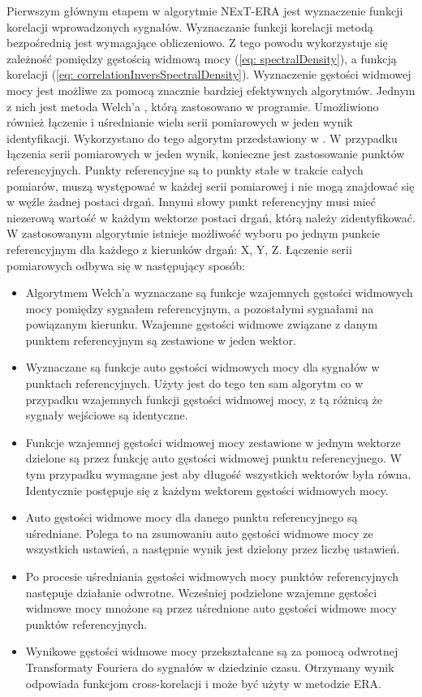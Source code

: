 Pierwszym głównym etapem w algorytmie NExT-ERA jest wyznaczenie funkcji korelacji wprowadzonych sygnałów. Wyznaczanie funkcji korelacji metodą bezpośrednią jest wymagające obliczeniowo. Z tego powodu wykorzystuje się zależność pomiędzy gęstością widmową mocy (\ref{eq: spectralDensity}), a funkcją korelacji (\ref{eq: correlationInversSpectralDensity}). Wyznaczenie gęstości widmowej mocy jest możliwe za pomocą znacznie bardziej efektywnych algorytmów. Jednym z nich jest metoda Welch'a \parencite{Brincker2015,Welch1967}, którą zastosowano w programie. Umożliwiono również łączenie i uśrednianie wielu serii pomiarowych w jeden wynik identyfikacji. Wykorzystano do tego algorytm przedstawiony w \cite{Brownjohn2010}. W przypadku łączenia serii pomiarowych w jeden wynik, konieczne jest zastosowanie punktów referencyjnych. Punkty referencyjne są to punkty stałe w trakcie całych pomiarów, muszą występować w każdej serii pomiarowej i nie mogą znajdować się w węźle żadnej postaci drgań. Innymi słowy punkt referencyjny musi mieć niezerową wartość w każdym wektorze postaci drgań, którą należy zidentyfikować. W zastosowanym algorytmie istnieje możliwość wyboru po jednym punkcie referencyjnym dla każdego z kierunków drgań: X, Y, Z. Łączenie serii pomiarowych odbywa się w następujący sposób:
\begin{itemize}
	\item Algorytmem Welch'a wyznaczane są funkcje wzajemnych gęstości widmowych mocy pomiędzy sygnałem referencyjnym, a pozostałymi sygnałami na powiązanym kierunku.  Wzajemne gęstości widmowe związane z danym punktem referencyjnym są zestawione w jeden wektor.
	\item Wyznaczane są funkcje auto gęstości widmowych mocy dla sygnałów w punktach referencyjnych. Użyty jest do tego ten sam algorytm co w przypadku wzajemnych funkcji gęstości widmowej mocy, z tą różnicą że sygnały wejściowe są identyczne. 
	\item Funkcje wzajemnej gęstości widmowej mocy zestawione w jednym wektorze dzielone są przez funkcję auto gęstości widmowej punktu referencyjnego. W tym przypadku wymagane jest aby długość  wszystkich wektorów była równa. Identycznie postępuje się z każdym wektorem gęstości widmowych mocy.
	\item Auto gęstości widmowe mocy dla danego punktu referencyjnego są uśredniane. Polega to na zsumowaniu auto gęstości widmowe mocy ze wszystkich ustawień, a następnie wynik jest dzielony przez liczbę ustawień.
	\item Po procesie uśredniania gęstości widmowych mocy punktów referencyjnych następuje działanie odwrotne. Wcześniej podzielone wzajemne gęstości widmowe mocy mnożone są przez uśrednione auto gęstości widmowe mocy punktów referencyjnych.
	\item Wynikowe gęstości widmowe mocy przekształcane są za pomocą odwrotnej Transformaty Fouriera do sygnałów w dziedzinie czasu. Otrzymany wynik odpowiada funkcjom cross-korelacji i może być użyty w metodzie ERA.
	
\end{itemize}

